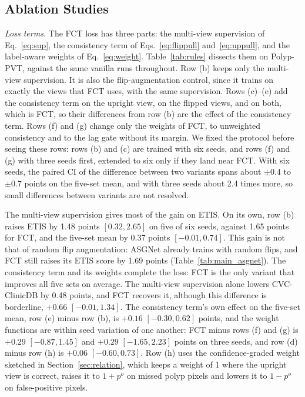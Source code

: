 \subsection{Ablation Studies}
\label{sec:ablation}

\textit{Loss terms.} The FCT loss has three parts: the multi-view supervision of Eq.~\eqref{eq:sup}, the
consistency term of Eqs.~\eqref{eq:flippull} and~\eqref{eq:uppull}, and the label-aware weights of
Eq.~\eqref{eq:weight}. Table~\ref{tab:rules} dissects them on Polyp-PVT, against the same vanilla runs
throughout. Row (b) keeps only the multi-view supervision. It is also the flip-augmentation control,
since it trains on exactly the views that FCT uses, with the same supervision. Rows (c)--(e) add the
consistency term on the upright view, on the flipped views, and on both, which is FCT, so their
differences from row (b) are the effect of the consistency term. Rows (f) and (g) change only the
weights of FCT, to unweighted consistency and to the lag gate without its margin. We fixed the protocol
before seeing these rows: rows (b) and (c) are trained with six seeds, and rows (f) and (g) with three
seeds first, extended to six only if they land near FCT.  With six seeds, the paired
CI of the difference between two variants spans about $\pm0.4$ to $\pm0.7$ points on the five-set
mean, and with three seeds about 2.4 times more, so small differences between variants are not
resolved.



The multi-view supervision gives most of the gain on ETIS. On its own, row (b) raises ETIS by 1.48
points $[0.32, 2.65]$ on five of six seeds, against 1.65 points for FCT, and the five-set mean by 0.37
points $[-0.01, 0.74]$. This gain is not that of random flip augmentation: ASGNet already trains with
random flips, and FCT still raises its ETIS score by 1.69 points (Table~\ref{tab:main_asgnet}). The consistency term and its weights complete the loss: FCT is the only
variant that improves all five sets on average. The multi-view supervision alone lowers CVC-ClinicDB
by 0.48 points, and FCT recovers it, although this difference is borderline, $+0.66$ $[-0.01, 1.34]$.
The consistency term's own effect on the five-set mean, row (e) minus row (b), is $+0.16$
$[-0.30, 0.62]$ points, and the weight functions are within seed variation of one another: FCT minus
rows (f) and (g) is $+0.29$ $[-0.87, 1.45]$ and $+0.29$ $[-1.65, 2.23]$ points on three seeds, and
row (d) minus row (h) is $+0.06$ $[-0.60, 0.73]$. Row (h) uses the confidence-graded weight sketched in
Section~\ref{sec:relation}, which keeps a weight of 1 where the upright view is correct, raises it to
$1+p^{o}$ on missed polyp pixels and lowers it to $1-p^{o}$ on false-positive pixels.

